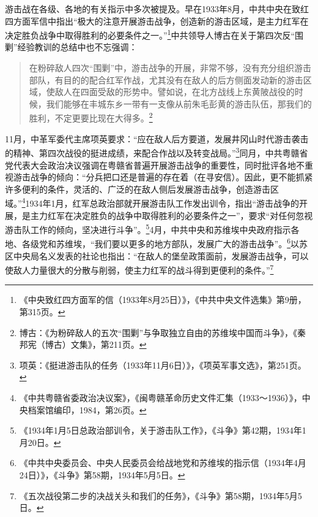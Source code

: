 游击战在各级、各地的有关指示中多次被提及。早在1933年8月，中共中央在致红四方面军信中指出“极大的注意开展游击战争，创造新的游击区域，是主力红军在决定胜负战争中取得胜利的必要条件之一。”\footnote{《中央致红四方面军的信（1933年8月25日）》，《中共中央文件选集》第9册，第315页。}中共领导人博古在关于第四次反“围剿”经验教训的总结中也不忘强调：

\begin{quote}

在粉碎敌人四次“围剿”中，游击战争的开展，非常不够，没有充分组织游击部队，有目的的配合红军作战，尤其没有在敌人的后方侧面发动新的游击区域，使敌人在四面受敌的形势中。譬如说，在北方战线上东黄陂战役的时候，我们能够在丰城东乡一带有一支像从前朱毛彭黄的游击队伍，那我们的胜利，不定更要比现在大得多。\footnote{博古：《为粉碎敌人的五次“围剿”与争取独立自由的苏维埃中国而斗争》，《秦邦宪（博古）文集》，第211页。}
\end{quote}


11月，中革军委代主席项英要求：“应在敌人后方要道，发展井冈山时代游击袭击的精神、第四次战役的挺进成绩，来配合作战以及转变战局。”\footnote{项英：《挺进游击队的任务（1933年11月6日）》，《项英军事文选》，第251页。}同月，中共粤赣省党代表大会政治决议强调在粤赣省普遍开展游击战争的重要性，同时批评各地不重视游击战争的倾向：“分兵把口还是普遍的存在着（在寻安信）。因此，更不能抓紧许多便利的条件，灵活的、广泛的在敌人侧后发展游击战争，创造游击区域。”\footnote{《中共粤赣省委政治决议案》，《闽粤赣革命历史文件汇集（1933～1936）》，中央档案馆编印，1984，第26页。}1934年1月，红军总政治部就开展游击队工作发出训令，指出“游击战争的开展，是主力红军在决定胜负的战争中取得胜利的必要条件之一”，要求“对任何忽视游击队工作的倾向，坚决进行斗争”。\footnote{《1934年1月5日总政治部训令，关于游击队工作》，《斗争》第42期，1934年1月20日。}4月，中共中央和苏维埃中央政府指示各地、各级党和苏维埃，“我们要以更多的地方部队，发展广大的游击战争”。\footnote{《中共中央委员会、中央人民委员会给战地党和苏维埃的指示信（1934年4月24日）》，《斗争》第58期，1934年5月5日。}以苏区中央局名义发表的社论也指出：“在敌人的堡垒政策面前，发展游击战争，可以使敌人力量很大的分散与削弱，使主力红军的战斗得到更便利的条件。”\footnote{《五次战役第二步的决战关头和我们的任务》，《斗争》第58期，1934年5月5日。}


